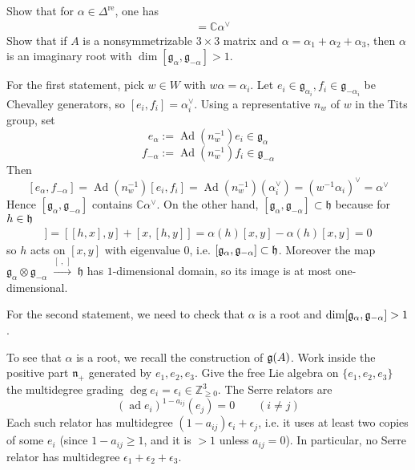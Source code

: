 \documentclass[12pt]{article}
\begin{document}
\begin{exercise}
    Show that for $\alpha \in \Delta^{\mathrm{re}}$, one has \begin{align*}
        [\mathfrak{g}_\alpha, \mathfrak{g}_{-\alpha}] & = \mathbb{C}\alpha^\vee
    \end{align*}
    Show that if $A$ is a nonsymmetrizable $3\times 3$ matrix and $\alpha = \alpha_1 + \alpha_2 + \alpha_3$, then $\alpha$ is an imaginary root with $\dim [\mathfrak{g}_\alpha, \mathfrak{g}_{-\alpha}] > 1$.
\end{exercise}

\begin{solution}[Incomplete]
    For the first statement, pick $w\in W$ with $w\alpha=\alpha_i$. Let $e_i\in\mathfrak g_{\alpha_i}, f_i\in\mathfrak g_{-\alpha_i}$ be Chevalley generators, so $[e_i,f_i]=\alpha_i^\vee$. Using a representative $n_w$ of $w$ in the Tits group, set
    \[e_\alpha:=\operatorname{Ad}(n_w^{-1})e_i\in\mathfrak g_\alpha\]\[
        f_{-\alpha}:=\operatorname{Ad}(n_w^{-1})f_i\in\mathfrak g_{-\alpha}\]
    Then
    \[[e_\alpha,f_{-\alpha}]
        =\operatorname{Ad}(n_w^{-1})[e_i,f_i]
        =\operatorname{Ad}(n_w^{-1})(\alpha_i^\vee)
        =(w^{-1}\alpha_i)^\vee=\alpha^\vee\]
    Hence $[\mathfrak g_\alpha,\mathfrak g_{-\alpha}]$ contains $\mathbb C\alpha^\vee$. On the other hand, $[\mathfrak g_\alpha,\mathfrak g_{-\alpha}]\subset\mathfrak h$ because for $h\in \mathfrak{h}$ \begin{align*}
        [h,[x,y]] = [[h,x],y]+[x,[h,y]] = \alpha(h)[x,y]-\alpha(h)[x,y]=0
    \end{align*} so $h$ acts on $[x,y]$ with eigenvalue $0$, i.e. $[\mathfrak g_\alpha,\mathfrak g_{-\alpha}] \subset \mathfrak{h}$.
    Moreover the map $\mathfrak g_\alpha \otimes \mathfrak g_{-\alpha}\;\xrightarrow{[\ ,\ ]}\; \mathfrak h$ has $1$-dimensional domain, so its image is at most one-dimensional.


    For the second statement, we need to check that $\alpha$ is a root and $\dim [\mathfrak{g}_\alpha,\mathfrak{g}_{-\alpha}]>1$.

    To see that $\alpha$ is a root, we recall the construction of $\mathfrak{g}(A)$. Work inside the positive part $\mathfrak{n}_+$ generated by $e_1,e_2,e_3$. Give the free Lie algebra on $\{e_1,e_2,e_3\}$ the multidegree grading $\deg e_i=\epsilon_i\in\mathbb{Z}_{\ge0}^3$. The Serre relators are
    \[(\operatorname{ad}e_i)^{1-a_{ij}}(e_j)=0\qquad(i\neq j)\]
    Each such relator has multidegree $(1-a_{ij})\epsilon_i+\epsilon_j$, i.e. it uses at least two copies of some $e_i$ (since $1-a_{ij}\ge1$, and it is $>1$ unless $a_{ij}=0$).  In particular, no Serre relator has multidegree $\epsilon_1+\epsilon_2+\epsilon_3$.


\end{solution}
\end{document}

